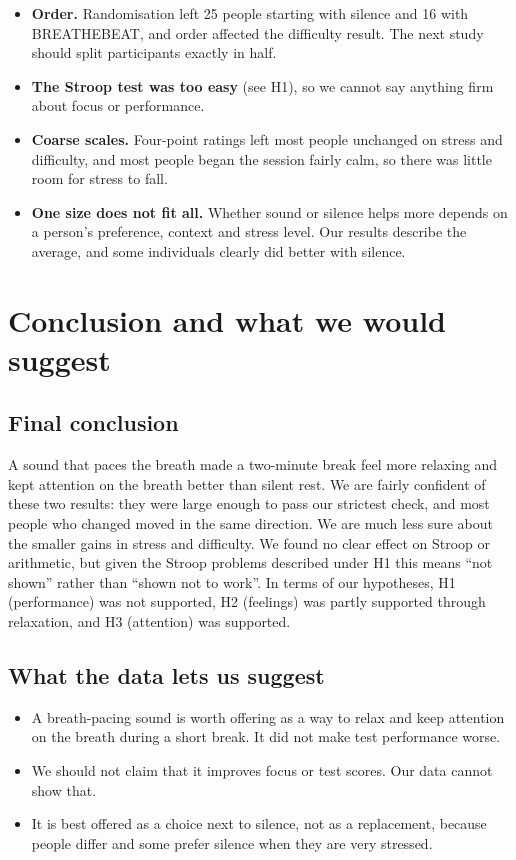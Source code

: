 \documentclass[11pt,a4paper]{article}
\begin{document}
\begin{itemize}
\item \textbf{Order.} Randomisation left 25 people starting with silence and 16 with BREATHEBEAT, and order affected the difficulty result. The next study should split participants exactly in half.
\item \textbf{The Stroop test was too easy} (see H1), so we cannot say anything firm about focus or performance.
\item \textbf{Coarse scales.} Four-point ratings left most people unchanged on stress and difficulty, and most people began the session fairly calm, so there was little room for stress to fall.
\item \textbf{One size does not fit all.} Whether sound or silence helps more depends on a person's preference, context and stress level. Our results describe the average, and some individuals clearly did better with silence.
\end{itemize}

\section{Conclusion and what we would suggest}

\subsection*{Final conclusion}

A sound that paces the breath made a two-minute break feel more relaxing and kept attention on the breath better than silent rest. We are fairly confident of these two results: they were large enough to pass our strictest check, and most people who changed moved in the same direction. We are much less sure about the smaller gains in stress and difficulty. We found no clear effect on Stroop or arithmetic, but given the Stroop problems described under H1 this means ``not shown'' rather than ``shown not to work''. In terms of our hypotheses, H1 (performance) was not supported, H2 (feelings) was partly supported through relaxation, and H3 (attention) was supported.

\subsection*{What the data lets us suggest}

\begin{itemize}
\item A breath-pacing sound is worth offering as a way to relax and keep attention on the breath during a short break. It did not make test performance worse.
\item We should not claim that it improves focus or test scores. Our data cannot show that.
\item It is best offered as a choice next to silence, not as a replacement, because people differ and some prefer silence when they are very stressed.
\end{itemize}
\end{document}
